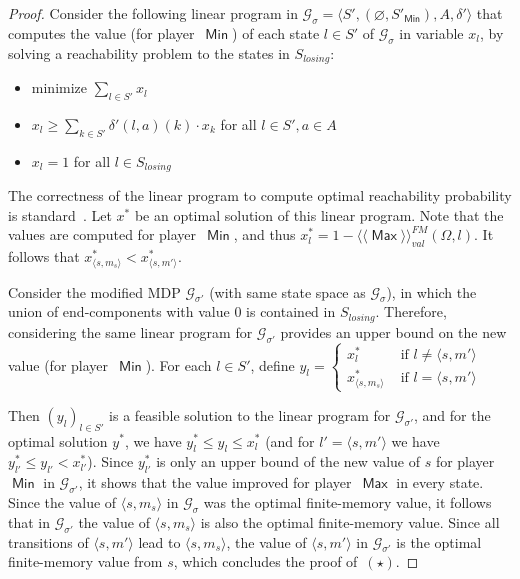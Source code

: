 \documentclass{article}
\newcommand{\tuple}[1]{\langle #1 \rangle}
\let\emptyset\varnothing
\newcommand{\GG}{\mathcal{G}}
\newcommand{\PP}{\delta}
\newcommand{\winval}[1]{\langle \! \langle #1 \rangle\! \rangle_{\mathit{val}} }
\newcommand{\vaf}{\winval{\ma}^{{FM}}}
\newcommand{\straa}{\sigma}
\DeclareMathOperator{\ma}{\mathsf{Max}}
\DeclareMathOperator{\mi}{\mathsf{Min}}
\begin{document}
\begin{proof}
\smallskip{}
Consider the following linear program in $\GG_\straa = \tuple{S', (\emptyset, S'_{\mi}), A, \PP'}$ 
that computes the value (for player~$\mi$) of each state $l \in S'$ of $\GG_{\straa}$ in variable $x_l$,
by solving a reachability problem to the states in $S_{losing}$: 
\begin{itemize}
\item[] minimize $\sum_{l \in S'} x_l$
\item[] $x_l \geq \sum_{k \in S'} \PP'(l,a)(k)\cdot x_k$ for all $l \in S', a \in A$
\item[] $x_l = 1$ for all $l \in S_{losing}$
\end{itemize}
The correctness of the linear program to compute optimal reachability probability 
is standard~\cite{FV97}.
Let $x^*$ be an optimal solution of this linear program. Note that the values
are computed for player~$\mi$, and thus $x^*_l = 1 - \vaf(\Omega, l)$.
It follows that $x^*_{\tuple{s,m_s}} < x^*_{\tuple{s,m'}}$.

\smallskip{}
Consider the modified MDP $\GG_{\straa'}$ (with same state space as $\GG_\straa$), 
in which the union of end-components with value $0$ is contained in $S_{losing}$. 
Therefore, considering the same linear program for $\GG_{\straa'}$ provides 
an upper bound on the new value (for player~$\mi$).
For each $l\in S'$, define $y_l = \left\{ \begin{array}{ll} x^*_l & \text { if }l \neq \tuple{s,m'} \\  
x^*_{\tuple{s,m_s}} & \text { if }l = \tuple{s,m'}  \end{array}  \right.$

\noindent Then $(y_l)_{l \in S'}$ is a feasible solution to the linear program for $\GG_{\straa'}$,
and for the optimal solution $y^*$, we have $y^*_l \leq y_l \leq x^*_l$ (and
for $l' = \tuple{s,m'}$ we have $y^*_{l'} \leq y_{l'} < x^*_{l'}$). Since 
$y^*_{l'}$ is only an upper bound of the new value of $s$ for player~$\mi$ in $\GG_{\straa'}$,
it shows that the value improved for player~$\ma$ in every state.  
Since the value of $\tuple{s,m_s}$ in $\GG_{\straa}$ was the optimal finite-memory value,
it follows that in $\GG_{\straa'}$ the value of $\tuple{s,m_s}$ is also the optimal finite-memory value.
Since all transitions of $\tuple{s,m'}$ lead to $\tuple{s,m_s}$, the value
of $\tuple{s,m'}$ in $\GG_{\straa'}$ is the optimal finite-memory value from $s$,
which concludes the proof of~$(\star)$.
\end{proof}
\end{document}
